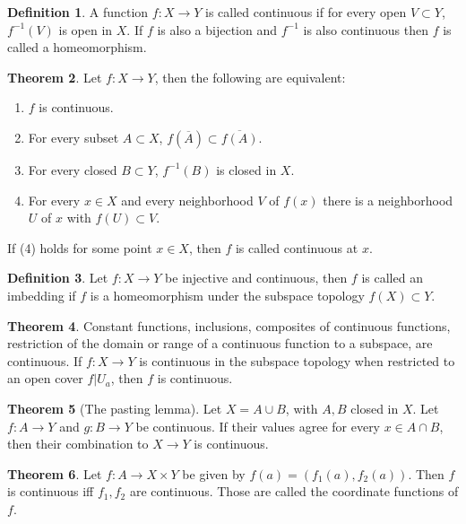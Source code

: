 \documentclass[twocolumn]{article}
\theoremstyle{definition}
\newtheorem{definition}{Definition}[section]
\newtheorem{theorem}[definition]{Theorem}
\begin{document}
\begin{definition}
    A function $f: X \rightarrow Y$ is called continuous if for every open $V \subset Y$, $f^{-1}(V)$ is open in $X$.
    If $f$ is also a bijection and $f^{-1}$ is also continuous then $f$ is called a homeomorphism.
\end{definition}
\begin{theorem}
    Let $f: X \rightarrow Y$, then the following are equivalent:
    \begin{enumerate}[noitemsep]
        \item $f$ is continuous.
        \item For every subset $A \subset X$, $f(\overline{A}) \subset \overline{f(A)}$.
        \item For every closed $B \subset Y$, $f^{-1}(B)$ is closed in $X$.
        \item For every $x \in X$ and every neighborhood $V$ of $f(x)$ there is a neighborhood $U$ of $x$ with $f(U) \subset V$.
    \end{enumerate}
    If (4) holds for some point $x \in X$, then $f$ is called continuous at $x$.
\end{theorem}
\begin{definition}
    Let $f: X \rightarrow Y$ be injective and continuous, then $f$ is called an imbedding if $f$ is a homeomorphism under the subspace topology $f(X) \subset Y$.
\end{definition}
\begin{theorem}
    Constant functions, inclusions, composites of continuous functions, restriction of the domain or range of a continuous function to a subspace, are continuous.
    If $f: X \rightarrow Y$ is continuous in the subspace topology when restricted to an open cover $f|U_a$, then $f$ is continuous.
\end{theorem}
\begin{theorem}[The pasting lemma]
    Let $X = A \cup B$, with $A, B$ closed in $X$. Let $f: A \rightarrow Y$ and $g: B \rightarrow Y$ be continuous. If their values agree for every $x \in A \cap B$, then their combination to $X \rightarrow Y$ is continuous.
\end{theorem}
\begin{theorem}
    Let $f: A \rightarrow X \times Y$ be given by $f(a) = (f_1(a), f_2(a))$. Then $f$ is continuous iff $f_1, f_2$ are continuous. Those are called the coordinate functions of $f$.
\end{theorem}
\end{document}
